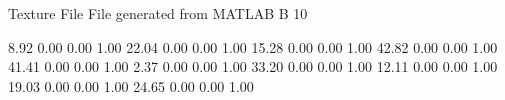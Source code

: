 Texture File
File generated from MATLAB
B 10

    8.92   0.00   0.00   1.00
   22.04   0.00   0.00   1.00
   15.28   0.00   0.00   1.00
   42.82   0.00   0.00   1.00
   41.41   0.00   0.00   1.00
    2.37   0.00   0.00   1.00
   33.20   0.00   0.00   1.00
   12.11   0.00   0.00   1.00
   19.03   0.00   0.00   1.00
   24.65   0.00   0.00   1.00

